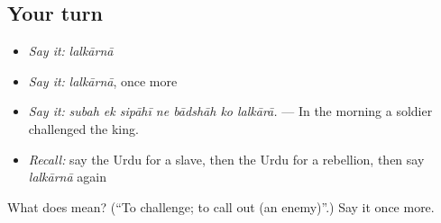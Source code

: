 \subsection*{Your turn}
\begin{itemize}
\raggedright
  \item \emph{Say it:} \emph{lalkārnā}
  \item \emph{Say it:} \emph{lalkārnā}, once more
  \item \emph{Say it:} \emph{subah ek sipāhī ne bādshāh ko lalkārā.} — In the morning a soldier challenged the king.
  \item \emph{Recall:} say the Urdu for a slave, then the Urdu for a rebellion, then say \emph{lalkārnā} again
\end{itemize}

\begin{tcolorbox}[breakable,colback=teal!4,colframe=teal!35!black,title={Before you move on}]
What does  mean? (\textquotedblleft{}To challenge; to call out (an enemy)\textquotedblright{}.) Say it once more.
\end{tcolorbox}
